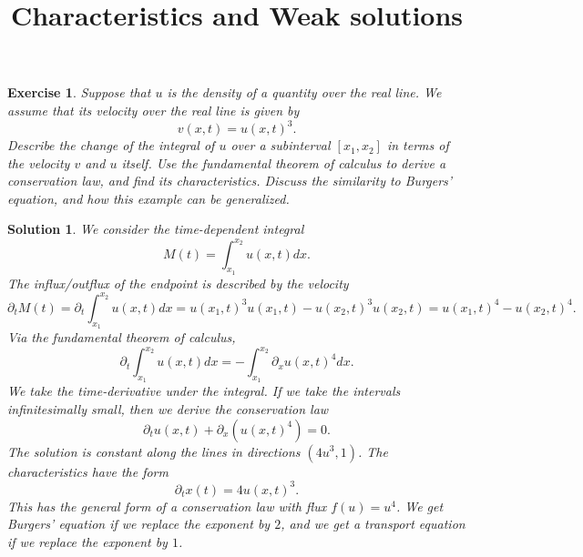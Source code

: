 \documentclass[10pt,letterpaper]{article}
\theoremstyle{break}
\newtheorem{exercise}{Exercise}
\newtheorem{solution}{Solution}
\begin{document}
\title{Characteristics and Weak solutions}
\date{}

\maketitle


































\begin{exercise}
    Suppose that $u$ is the density of a quantity over the real line.
    We assume that its velocity over the real line is given by
    $$
        v(x,t) = u(x,t)^3.
    $$
    Describe the change of the integral of $u$ over a subinterval $[x_1,x_2]$ in terms of the velocity $v$ and $u$ itself. Use the fundamental theorem of calculus to derive a conservation law, and find its characteristics. 
    Discuss the similarity to Burgers' equation, and how this example can be generalized.
\end{exercise}

\begin{solution}
    We consider the time-dependent integral 
    $$
        M(t) = \int_{x_1}^{x_2} u(x,t) dx.
    $$
    The influx/outflux of the endpoint is described by the velocity 
    $$
        \partial_t M(t) 
        =
        \partial_t \int_{x_1}^{x_2} u(x,t) dx
        =
        u(x_1,t)^3 u(x_1,t) - u(x_2,t)^3 u(x_2,t) 
        =
        u(x_1,t)^4 - u(x_2,t)^4 
        .
    $$
    Via the fundamental theorem of calculus,
    $$
        \partial_t \int_{x_1}^{x_2} u(x,t) dx
        =
        - \int_{x_1}^{x_2} \partial_x u(x,t)^4 dx
        .
    $$
    We take the time-derivative under the integral. 
    If we take the intervals infinitesimally small, then we derive the conservation law
    $$
        \partial_t u(x,t)
        +
        \partial_x \left( u(x,t)^4 \right)
        =
        0
        .
    $$
    The solution is constant along the lines in directions $(4u^3,1)$.
    The characteristics have the form 
    $$
        \partial_t x(t) = 4u(x,t)^3.
    $$
    This has the general form of a conservation law with flux $f(u) = u^4$.
    We get Burgers' equation if we replace the exponent by $2$,
    and we get a transport equation if we replace the exponent by $1$.
\end{solution}
\end{document}
